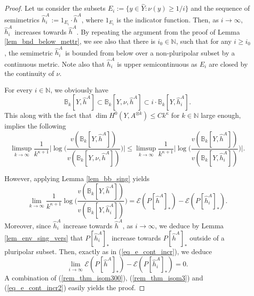 \documentclass[12pt]{article}
\numberwithin{equation}{section}
\theoremstyle{theorem}
\theoremstyle{definition}
\theoremstyle{remark}
\newcommand{\vol}{v}
\newcommand{\nat}{\mathbb{N}}
\begin{document}
	\begin{proof}
		Let us consider the subsets $E_i := \{ y \in \widehat{Y} : \nu(y) \geq 1/i \}$ and the sequence of semimetrics $\widehat{h}^A_i := 1_{E_i} \cdot \widehat{h}^A$, where $1_{E_i}$ is the indicator function.
		Then, as $i \to \infty$, $\widehat{h}^A_i$ increases towards $\widehat{h}^A$.
		By repeating the argument from the proof of Lemma \ref{lem_bnd_below_mettr}, we see also that there is $i_0 \in \nat$, such that for any $i \geq i_0$, the semimetric $\widehat{h}^A_i$ is bounded from below over a non-pluripolar subset by a continuous metric.
		Note also that $\widehat{h}^A_i$ is upper semicontinuous as $E_i$ are closed by the continuity of $\nu$.
		\par 
		For every $i \in \nat$, we obviously have
		\begin{equation}
			\mathbb{B}_k[Y, \widehat{h}^A]
			\subset
			\mathbb{B}_k[Y, \nu, \widehat{h}^A]
			\subset
			i \cdot \mathbb{B}_k[Y, \widehat{h}^A_i].
		\end{equation}
		This along with the fact that $\dim H^0(Y, A^{\otimes k}) \leq C k^{\kappa}$ for $k \in \nat$ large enough, implies the following
		\begin{equation}\label{rem_thm_isom300}
			\limsup_{k \to \infty}
			\frac{1}{k^{\kappa + 1}}
			\Big|\log
			\Big(
			\frac{\vol(\mathbb{B}_k[Y, \widehat{h}^A])}{\vol(\mathbb{B}_k[Y, \nu, \widehat{h}^A])}\Big) \Big|
			\leq
			\limsup_{k \to \infty}
			\frac{1}{k^{\kappa + 1}}
			\Big|
			\log\Big(
			\frac{\vol(\mathbb{B}_k[Y, \widehat{h}^A])}{\vol(\mathbb{B}_k[Y, \widehat{h}^A_i])}\Big)
			\Big|.
		\end{equation}
		\par 
		However, applying Lemma \ref{lem_bb_sing} yields 
		\begin{equation}\label{rem_thm_isom3}
			\lim_{k \to \infty}
			\frac{1}{k^{\kappa + 1}}
			\log\Big(
			\frac{\vol(\mathbb{B}_k[Y, \widehat{h}^A])}{\vol(\mathbb{B}_k[Y, \widehat{h}^A_i])}\Big)
			=
			\mathscr{E}(P[\widehat{h}^A]_*) - \mathscr{E}(P[\widehat{h}^A_i]_*).
		\end{equation}
		Moreover, since $\widehat{h}^A_i$ increase towards $\widehat{h}^A$, as $i \to \infty$, we deduce by Lemma \ref{lem_env_sing_vers} that $P[\widehat{h}^A_i]_*$ increase towards $P[\widehat{h}^A]_*$ outside of a pluripolar subset.
		Then, exactly as in (\ref{eq_e_cont_incr}), we deduce
		\begin{equation}\label{eq_e_cont_incr2}
			\lim_{i \to \infty}
			\mathscr{E}(P[\widehat{h}^A]_*) - \mathscr{E}(P[\widehat{h}^A_i]_*)
			=
			0.
		\end{equation}
		A combination of (\ref{rem_thm_isom300}), (\ref{rem_thm_isom3}) and (\ref{eq_e_cont_incr2}) easily yields the proof.
	\end{proof}
\end{document}
